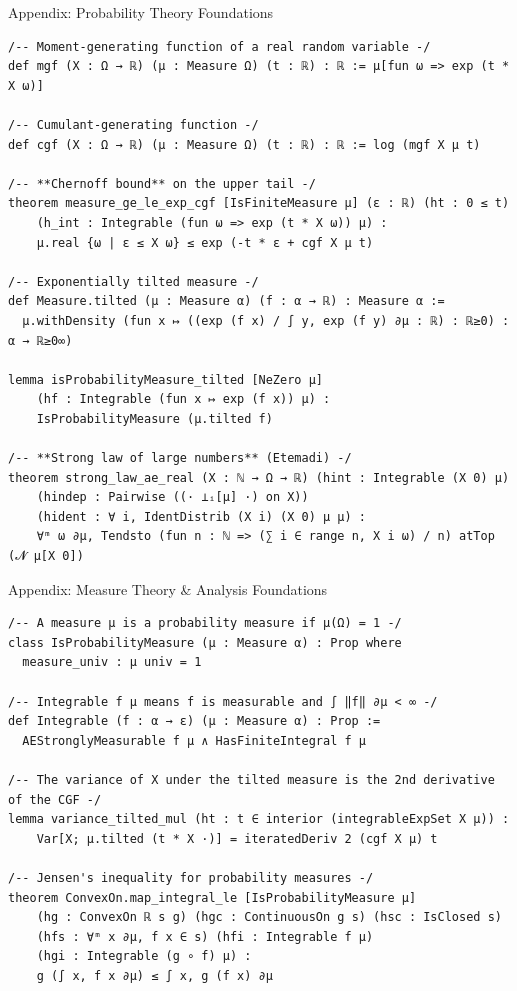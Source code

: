 \documentclass[aspectratio=169]{beamer}
\begin{document}
\begin{frame}[fragile]{Appendix: Probability Theory Foundations}
\begin{lstlisting}[basicstyle=\ttfamily\tiny]
/-- Moment-generating function of a real random variable -/
def mgf (X : Ω → ℝ) (μ : Measure Ω) (t : ℝ) : ℝ := μ[fun ω => exp (t * X ω)]

/-- Cumulant-generating function -/
def cgf (X : Ω → ℝ) (μ : Measure Ω) (t : ℝ) : ℝ := log (mgf X μ t)

/-- **Chernoff bound** on the upper tail -/
theorem measure_ge_le_exp_cgf [IsFiniteMeasure μ] (ε : ℝ) (ht : 0 ≤ t)
    (h_int : Integrable (fun ω => exp (t * X ω)) μ) :
    μ.real {ω | ε ≤ X ω} ≤ exp (-t * ε + cgf X μ t)

/-- Exponentially tilted measure -/
def Measure.tilted (μ : Measure α) (f : α → ℝ) : Measure α :=
  μ.withDensity (fun x ↦ ((exp (f x) / ∫ y, exp (f y) ∂μ : ℝ) : ℝ≥0) : α → ℝ≥0∞)

lemma isProbabilityMeasure_tilted [NeZero μ]
    (hf : Integrable (fun x ↦ exp (f x)) μ) :
    IsProbabilityMeasure (μ.tilted f)

/-- **Strong law of large numbers** (Etemadi) -/
theorem strong_law_ae_real (X : ℕ → Ω → ℝ) (hint : Integrable (X 0) μ)
    (hindep : Pairwise ((· ⟂ᵢ[μ] ·) on X))
    (hident : ∀ i, IdentDistrib (X i) (X 0) μ μ) :
    ∀ᵐ ω ∂μ, Tendsto (fun n : ℕ => (∑ i ∈ range n, X i ω) / n) atTop (𝓝 μ[X 0])
\end{lstlisting}
\end{frame}

\begin{frame}[fragile]{Appendix: Measure Theory \& Analysis Foundations}
\begin{lstlisting}[basicstyle=\ttfamily\tiny]
/-- A measure μ is a probability measure if μ(Ω) = 1 -/
class IsProbabilityMeasure (μ : Measure α) : Prop where
  measure_univ : μ univ = 1

/-- Integrable f μ means f is measurable and ∫ ‖f‖ ∂μ < ∞ -/
def Integrable (f : α → ε) (μ : Measure α) : Prop :=
  AEStronglyMeasurable f μ ∧ HasFiniteIntegral f μ

/-- The variance of X under the tilted measure is the 2nd derivative of the CGF -/
lemma variance_tilted_mul (ht : t ∈ interior (integrableExpSet X μ)) :
    Var[X; μ.tilted (t * X ·)] = iteratedDeriv 2 (cgf X μ) t

/-- Jensen's inequality for probability measures -/
theorem ConvexOn.map_integral_le [IsProbabilityMeasure μ]
    (hg : ConvexOn ℝ s g) (hgc : ContinuousOn g s) (hsc : IsClosed s)
    (hfs : ∀ᵐ x ∂μ, f x ∈ s) (hfi : Integrable f μ)
    (hgi : Integrable (g ∘ f) μ) :
    g (∫ x, f x ∂μ) ≤ ∫ x, g (f x) ∂μ
\end{lstlisting}
\end{frame}
\end{document}
